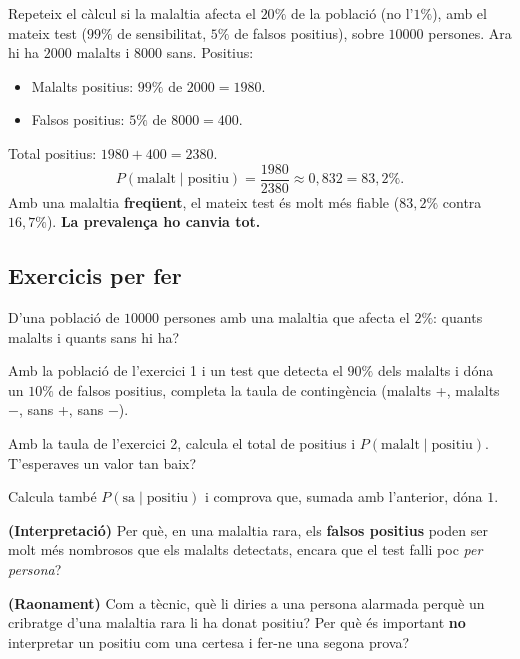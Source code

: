 \begin{exresolt}
Repeteix el càlcul si la malaltia afecta el \textbf{$20\%$} de la població (no l'$1\%$),
amb el mateix test ($99\%$ de sensibilitat, $5\%$ de falsos positius), sobre
$\num{10000}$ persones.
\solucio
Ara hi ha $\num{2000}$ malalts i $\num{8000}$ sans. Positius:
\begin{itemize}[leftmargin=1.4em, itemsep=1pt]
  \item Malalts positius: $99\%$ de $\num{2000}=\num{1980}$.
  \item Falsos positius: $5\%$ de $\num{8000}=400$.
\end{itemize}
Total positius: $\num{1980}+400=\num{2380}$.
\[
P(\text{malalt}\mid\text{positiu})=\frac{\num{1980}}{\num{2380}}\approx 0,832=83,2\%.
\]
Amb una malaltia \textbf{freqüent}, el mateix test és molt més fiable ($83,2\%$ contra
$16,7\%$). \textbf{La prevalença ho canvia tot.}
\end{exresolt}

\subsection{Exercicis per fer}

\begin{exercicis}
\begin{exlist}
  \item D'una població de $\num{10000}$ persones amb una malaltia que afecta el $2\%$:
        quants malalts i quants sans hi ha?
  \item Amb la població de l'exercici 1 i un test que detecta el $90\%$ dels malalts i
        dóna un $10\%$ de falsos positius, completa la taula de contingència (malalts +,
        malalts $-$, sans +, sans $-$).
  \item Amb la taula de l'exercici 2, calcula el total de positius i
        $P(\text{malalt}\mid\text{positiu})$. T'esperaves un valor tan baix?
  \item Calcula també $P(\text{sa}\mid\text{positiu})$ i comprova que, sumada amb
        l'anterior, dóna $1$.
  \item \textbf{(Interpretació)} Per què, en una malaltia rara, els \textbf{falsos
        positius} poden ser molt més nombrosos que els malalts detectats, encara que el
        test falli poc \emph{per persona}?
  \item \textbf{(Raonament)} Com a tècnic, què li diries a una persona alarmada perquè
        un cribratge d'una malaltia rara li ha donat positiu? Per què és important
        \textbf{no} interpretar un positiu com una certesa i fer-ne una segona prova?
\end{exlist}
\end{exercicis}

